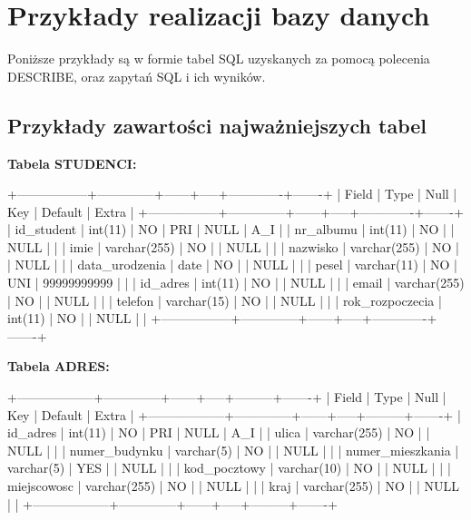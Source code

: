 \documentclass[12pt,a4paper]{article}
\newenvironment{sqltable}%
{\snugshade\verbatim}%
{\endverbatim\endsnugshade}
\begin{document}
\section{Przykłady realizacji bazy danych}
\label{sec:ExamplesSection}

Poniższe przykłady są w formie tabel SQL uzyskanych za pomocą polecenia DESCRIBE, oraz zapytań SQL i ich wyników.

\subsection{Przykłady zawartości najważniejszych tabel}
\label{sec:ExampleTables}

\textbf{Tabela STUDENCI:}

\begin{sqltable}
+-----------------+--------------+------+-----+-------------+-------+
| Field           | Type         | Null | Key | Default     | Extra |
+-----------------+--------------+------+-----+-------------+-------+
| id_student      | int(11)      | NO   | PRI | NULL        | A_I   |
| nr_albumu       | int(11)      | NO   |     | NULL        |       |
| imie            | varchar(255) | NO   |     | NULL        |       |
| nazwisko        | varchar(255) | NO   |     | NULL        |       |
| data_urodzenia  | date         | NO   |     | NULL        |       |
| pesel           | varchar(11)  | NO   | UNI | 99999999999 |       |
| id_adres        | int(11)      | NO   |     | NULL        |       |
| email           | varchar(255) | NO   |     | NULL        |       |
| telefon         | varchar(15)  | NO   |     | NULL        |       |
| rok_rozpoczecia | int(11)      | NO   |     | NULL        |       |
+-----------------+--------------+------+-----+-------------+-------+
\end{sqltable}

\textbf{Tabela ADRES:}

\begin{sqltable}
+------------------+--------------+------+-----+---------+-------+
| Field            | Type         | Null | Key | Default | Extra |
+------------------+--------------+------+-----+---------+-------+
| id_adres         | int(11)      | NO   | PRI | NULL    | A_I   |
| ulica            | varchar(255) | NO   |     | NULL    |       |
| numer_budynku    | varchar(5)   | NO   |     | NULL    |       |
| numer_mieszkania | varchar(5)   | YES  |     | NULL    |       |
| kod_pocztowy     | varchar(10)  | NO   |     | NULL    |       |
| miejscowosc      | varchar(255) | NO   |     | NULL    |       |
| kraj             | varchar(255) | NO   |     | NULL    |       |
+------------------+--------------+------+-----+---------+-------+
\end{sqltable}
\end{document}
